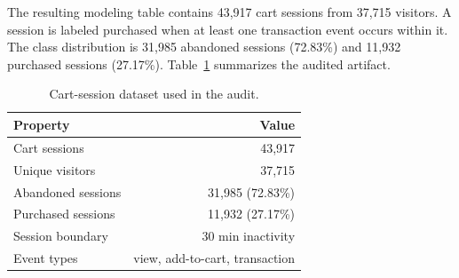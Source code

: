 \documentclass[conference, letterpaper]{IEEEtran}
\begin{document}
The resulting modeling table contains 43,917 cart sessions from 37,715 visitors. A session is labeled purchased when at least one transaction event occurs within it. The class distribution is 31,985 abandoned sessions (72.83\%) and 11,932 purchased sessions (27.17\%). Table~\ref{tab:data} summarizes the audited artifact.

\begin{table}[t]
\caption{Cart-session dataset used in the audit.}
\label{tab:data}
\centering
\small
\begin{tabular}{lr}
\toprule
Property & Value \\
\midrule
Cart sessions & 43,917 \\
Unique visitors & 37,715 \\
Abandoned sessions & 31,985 (72.83\%) \\
Purchased sessions & 11,932 (27.17\%) \\
Session boundary & 30 min inactivity \\
Event types & view, add-to-cart, transaction \\
\bottomrule
\end{tabular}
\end{table}
\end{document}
